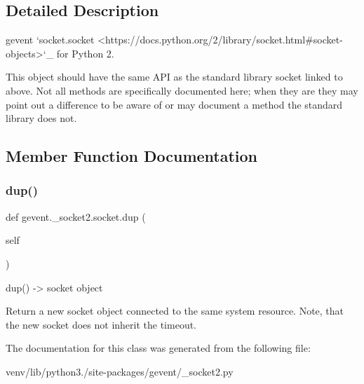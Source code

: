 \subsection{Detailed Description}
\begin{DoxyVerb}gevent `socket.socket <https://docs.python.org/2/library/socket.html#socket-objects>`_
for Python 2.

This object should have the same API as the standard library socket linked to above. Not all
methods are specifically documented here; when they are they may point out a difference
to be aware of or may document a method the standard library does not.
\end{DoxyVerb}
 

\subsection{Member Function Documentation}
\mbox{\label{classgevent_1_1__socket2_1_1socket_a9c65f4bce0a2d18a552e1f55744ebff5}} 
\subsubsection{\texorpdfstring{dup()}{dup()}}
{\footnotesize\ttfamily def gevent.\+\_\+socket2.\+socket.\+dup (\begin{DoxyParamCaption}\item[{}]{self }\end{DoxyParamCaption})}

\begin{DoxyVerb}dup() -> socket object

Return a new socket object connected to the same system resource.
Note, that the new socket does not inherit the timeout.\end{DoxyVerb}
 

The documentation for this class was generated from the following file\+:\begin{DoxyCompactItemize}
\item 
venv/lib/python3./site-\/packages/gevent/\+\_\+socket2.\+py\end{DoxyCompactItemize}
